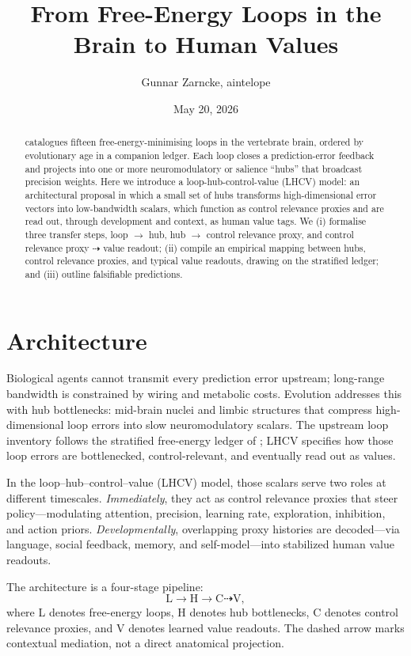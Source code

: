 \documentclass[11pt]{article}
\title{From Free-Energy Loops in the Brain to Human Values}
\author{Gunnar Zarncke, aintelope}
\date{May 20, 2026}
\begin{document}
\maketitle

\begin{abstract}
\citet{zarncke2025stratification} catalogues fifteen free-energy-minimising loops in the vertebrate brain, ordered by evolutionary age in a companion ledger.
Each loop closes a prediction-error feedback and projects into one or more neuromodulatory or salience ``hubs'' that broadcast precision weights.
Here we introduce a loop-hub-control-value (LHCV) model:
an architectural proposal in which a small set of hubs transforms high-dimensional error vectors into low-bandwidth scalars,
which function as control relevance proxies and are read out, through development and context, as human value tags.
We (i) formalise three transfer steps, loop $\to$ hub, hub $\to$ control relevance proxy, and control relevance proxy $\dashrightarrow$ value readout;
(ii) compile an empirical mapping between hubs, control relevance proxies, and typical value readouts, drawing on the stratified ledger;
and (iii) outline falsifiable predictions.
\end{abstract}

\section{Architecture}

Biological agents cannot transmit every prediction error upstream; long-range bandwidth is constrained by wiring and metabolic costs. Evolution addresses this with hub bottlenecks: mid-brain nuclei and limbic structures that compress high-dimensional loop errors into slow neuromodulatory scalars.
The upstream loop inventory follows the stratified free-energy ledger of \citet{zarncke2025stratification}; LHCV specifies how those loop errors are bottlenecked, control-relevant, and eventually read out as values.

In the loop--hub--control--value (LHCV) model, those scalars serve two roles at different timescales. \emph{Immediately}, they act as control relevance proxies that steer policy---modulating attention, precision, learning rate, exploration, inhibition, and action priors. \emph{Developmentally}, overlapping proxy histories are decoded---via language, social feedback, memory, and self-model---into stabilized human value readouts.

The architecture is a four-stage pipeline:
\[
\mathrm{L} \to \mathrm{H} \to \mathrm{C} \dashrightarrow \mathrm{V},
\]
where L denotes free-energy loops, H denotes hub bottlenecks, C denotes control relevance proxies, and V denotes learned value readouts. The dashed arrow marks contextual mediation, not a direct anatomical projection.
\end{document}
